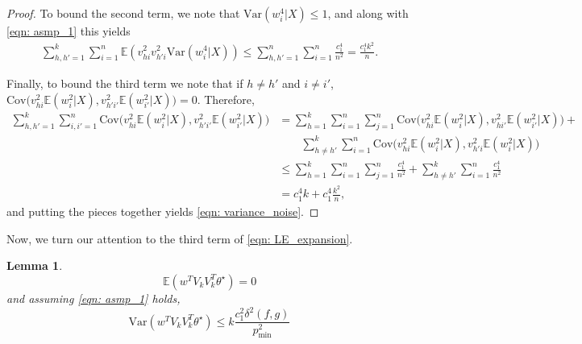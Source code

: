 \documentclass{article}
\newcommand{\Var}{\mathrm{Var}}
\newcommand{\1}{\mathbb{I}}
\newcommand{\thetast}{\theta^{\star}}
\newcommand{\Ebb}{\mathbb{E}}
\theoremstyle{alden}
\theoremstyle{aldenthm}
\newtheorem{lemma}{Lemma}
\theoremstyle{definition}
\theoremstyle{remark}
\begin{document}
\begin{proof}
	To bound the second term, we note that $\Var(w_i^4|X) \leq 1$, and along with \eqref{eqn: asmp_1} this yields
	\begin{align*}
	\sum_{h,h' = 1}^{k} \sum_{i = 1}^{n} \Ebb \left(v_{hi}^2 v_{h'i}^2 \Var(w_i^4|X)\right) \leq \sum_{h,h' = 1}^{n} \sum_{i = 1}^{n} \frac{c_1^4}{n^2} = \frac{c_1^4k^2}{n}.
	\end{align*}
	
	Finally, to bound the third term we note that if $h \neq h'$ and $i \neq i'$,
	$\mathrm{Cov} \bigl( v_{hi} ^2 \Ebb(w_i^2|X), v_{h'i'}^2 \Ebb(w_{i'}^2|X)\bigr) = 0$. Therefore,
	\begin{align*}
	\sum_{h,h' = 1}^{k} \sum_{i,i' = 1}^{n} \mathrm{Cov} \bigl( v_{hi} ^2 \Ebb(w_i^2|X), v_{h'i'}^2 \Ebb(w_{i'}^2|X)\bigr) & = \sum_{h = 1}^{k} \sum_{i = 1}^{n} \sum_{j = 1}^{n} \mathrm{Cov} \bigl( v_{hi} ^2 \Ebb(w_i^2|X), v_{hi'}^2 \Ebb(w_{i'}^2|X)\bigr) + \\
	& \quad \quad \sum_{h \neq h'}^{k} \sum_{i = 1}^{n} \mathrm{Cov} \bigl( v_{hi} ^2 \Ebb(w_i^2|X), v_{h'i}^2 \Ebb(w_{i}^2|X)\bigr) \\
	& \leq \sum_{h = 1}^{k} \sum_{i = 1}^{n} \sum_{j = 1}^{n} \frac{c_1^4}{n^2} + \sum_{h \neq h'}^{k} \sum_{i = 1}^{n} \frac{c_1^4}{n^2} \\
	& = c_1^4 k + c_1^4 \frac{k^2}{n},
	\end{align*}
	and putting the pieces together yields \eqref{eqn: variance_noise}.
\end{proof}

Now, we turn our attention to the third term of \eqref{eqn: LE_expansion}.
\begin{lemma}
	\begin{equation}
	\Ebb(w^T V_k V_k^T \thetast) = 0
	\end{equation}
	and assuming \eqref{eqn: asmp_1} holds,
	\begin{equation*}
	\Var(w^T V_k V_k^T \thetast) \leq k \frac{c_1^2 \delta^2(f,g)}{p_{\min}^2}
	\end{equation*}
\end{lemma}
\end{document}

